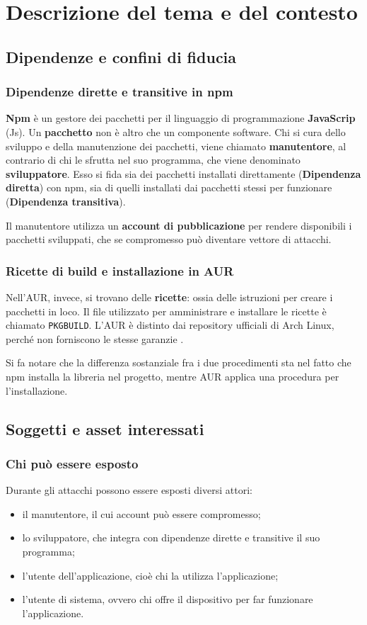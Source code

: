 \section{Descrizione del tema e del contesto}
\subsection{Dipendenze e confini di fiducia}
\subsubsection{Dipendenze dirette e transitive in npm}
\textbf{Npm} è un gestore dei pacchetti per il linguaggio di programmazione 
\textbf{JavaScrip} (Js). Un \textbf{pacchetto} non è altro che un componente software. 
Chi si cura dello sviluppo e della manutenzione dei pacchetti, 
viene chiamato \textbf{manutentore}, al contrario di chi le sfrutta nel suo 
programma, che viene denominato \textbf{sviluppatore}. Esso si fida sia dei 
pacchetti installati direttamente (\textbf{Dipendenza diretta}) con npm, 
sia di quelli installati dai pacchetti stessi per funzionare 
(\textbf{Dipendenza transitiva}).

Il manutentore utilizza un \textbf{account di pubblicazione} 
per rendere disponibili i pacchetti sviluppati, che se compromesso 
può diventare vettore di attacchi.

\subsubsection{Ricette di build e installazione in AUR}
Nell’AUR, invece, si trovano delle \textbf{ricette}: ossia delle istruzioni 
per creare i pacchetti in loco. Il file utilizzato per amministrare e 
installare le ricette è chiamato \texttt{PKGBUILD}. L’AUR è distinto dai 
repository ufficiali di Arch Linux, perché non forniscono le stesse 
garanzie \cite{archwiki-aur}.

Si fa notare che la differenza sostanziale fra i due procedimenti 
sta nel fatto che npm installa la libreria nel progetto, mentre AUR applica 
una procedura per l’installazione.

\subsection{Soggetti e asset interessati}
\subsubsection{Chi può essere esposto}
Durante gli attacchi possono essere esposti diversi attori:
\begin{itemize}
    \item[] il manutentore, il cui account può essere compromesso;
    \item[] lo sviluppatore, che integra con dipendenze dirette 
    e transitive il suo programma;
    \item[] l’utente dell’applicazione, cioè chi la utilizza 
    l’applicazione;
    \item[] l’utente di sistema, ovvero chi offre il dispositivo 
    per far funzionare l’applicazione.
\end{itemize}

